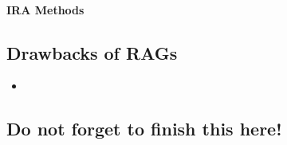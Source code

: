 \paragraph{IRA Methods}
\label{sec:IRA}

\subsection{Drawbacks of RAGs}
\label{sec:drawbacks}

\begin{itemize}
    \item 
\end{itemize}

\subsection{Do not forget to finish this here!}
